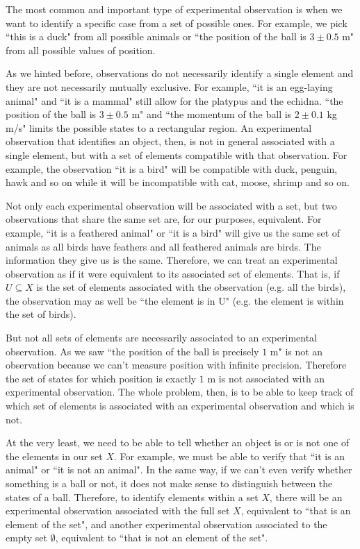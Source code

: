 \documentclass[11pt,letterpaper,fleqn]{memoir} %
\begin{document}
The most common and important type of experimental observation is when we want to identify a specific case from a set of possible ones. For example, we pick ``this is a duck" from all possible animals or ``the position of the ball is $3 \pm 0.5$ m" from all possible values of position.

As we hinted before, observations do not necessarily identify a single element and they are not necessarily mutually exclusive. For example, ``it is an egg-laying animal" and ``it is a mammal" still allow for the platypus and the echidna. ``the position of the ball is $3 \pm 0.5$ m" and ``the momentum of the ball is $2 \pm 0.1$ kg m/s" limits the possible states to a rectangular region. An experimental observation that identifies an object, then, is not in general associated with a single element, but with a set of elements compatible with that observation. For example, the observation ``it is a bird" will be compatible with duck, penguin, hawk and so on while it will be incompatible with cat, moose, shrimp and so on.

Not only each experimental observation will be associated with a set, but two observations that share the same set are, for our purposes, equivalent. For example, ``it is a feathered animal" or ``it is a bird" will give us the same set of animals as all birds have feathers and all feathered animals are birds. The information they give us is the same. Therefore, we can treat an experimental observation as if it were equivalent to its associated set of elements. That is, if $U \subseteq X$ is the set of elements associated with the observation (e.g. all the birds), the observation may as well be ``the element is in U" (e.g. the element is within the set of birds).

But not all sets of elements are necessarily associated to an experimental observation. As we saw ``the position of the ball is precisely $1$ m" is not an observation because we can't measure position with infinite precision. Therefore the set of states for which position is exactly $1$ m is not associated with an experimental observation. The whole problem, then, is to be able to keep track of which set of elements is associated with an experimental observation and which is not.

At the very least, we need to be able to tell whether an object is or is not one of the elements in our set $X$. For example, we must be able to verify that ``it is an animal" or ``it is not an animal". In the same way, if we can't even verify whether something is a ball or not, it does not make sense to distinguish between the states of a ball. Therefore, to identify elements within a set $X$, there will be an experimental observation associated with the full set $X$, equivalent to ``that is an element of the set", and another experimental observation associated to the empty set $\emptyset$, equivalent to ``that is not an element of the set".
\end{document}
